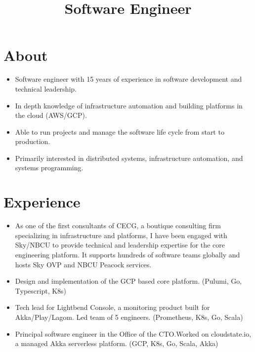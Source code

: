 \documentclass[11pt,a4paper,roman]{moderncv}
\title{Software Engineer}
\begin{document}
\makecvtitle{}

\section{About}
\begin{itemize}
  \item Software engineer with 15 years of experience in software development and technical leadership.
  \item In depth knowledge of infrastructure automation and building platforms in the cloud (AWS/GCP).
  \item Able to run projects and manage the software life cycle from start to production.
  \item Primarily interested in distributed systems, infrastructure automation, and systems programming.
\end{itemize}

\section{Experience}

\begin{itemize}
  \item As one of the first consultants of CECG, a boutique consulting firm specializing in infrastructure and
        platforms, I have been engaged with Sky/NBCU to provide technical and leadership expertise for the core engineering
        platform.  It supports hundreds of software teams globally and hosts Sky OVP and NBCU Peacock services.
  \item Design and implementation of the GCP based core platform. (Pulumi, Go, Typescript, K8s)
\end{itemize}

\vspace{5mm}

\begin{itemize}
  \item Tech lead for Lightbend Console, a monitoring product built for Akka/Play/Lagom. Led
        team of 5 engineers. (Prometheus, K8s, Go, Scala)
  \item Principal software engineer in the Office of the CTO.\@ Worked on cloudstate.io, a managed Akka serverless platform.
        (GCP, K8s, Go, Scala, Akka)
\end{itemize}
\end{document}
